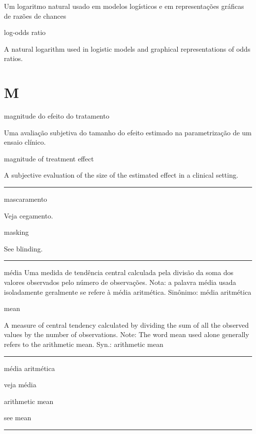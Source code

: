 \documentclass[
]{book}
\begin{document}
Um logaritmo natural usado em modelos logísticos e em representações gráficas de razões de chances

log-odds ratio

A natural logarithm used in logistic models and graphical representations of odds ratios.

\hypertarget{m}{%
\chapter*{M}\label{m}}

magnitude do efeito do tratamento

Uma avaliação subjetiva do tamanho do efeito estimado na parametrização de um ensaio clínico.

magnitude of treatment effect

A subjective evaluation of the size of the estimated effect in a clinical setting.

\begin{center}\rule{0.5\linewidth}{0.5pt}\end{center}

mascaramento

Veja cegamento.

masking

See blinding.

\begin{center}\rule{0.5\linewidth}{0.5pt}\end{center}

média
Uma medida de tendência central calculada pela divisão da soma dos valores observados pelo número de observações. Nota: a palavra média usada isoladamente geralmente se refere à média aritmética. Sinônimo: média aritmética

mean

A measure of central tendency calculated by dividing the sum of all the observed values by the number of observations. Note: The word mean used alone generally refers to the arithmetic mean. Syn.: arithmetic mean

\begin{center}\rule{0.5\linewidth}{0.5pt}\end{center}

média aritmética

veja média

arithmetic mean

see mean

\begin{center}\rule{0.5\linewidth}{0.5pt}\end{center}
\end{document}
